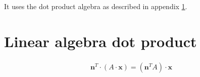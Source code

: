 \documentclass{article}
\begin{document}
It uses the dot product algebra as described in appendix \ref{appendix_dot_product}.


%
\appendix
\section{Linear algebra dot product}\label{appendix_dot_product}

\begin{equation} \label{eq:rekenregel_dot_product}
\begin{aligned}
\boldsymbol{n}^T \cdot (A \cdot \boldsymbol{x}) =(\boldsymbol{n}^T A) \cdot \boldsymbol{x}
\end{aligned}
\end{equation}



\printbibliography
\end{document}
